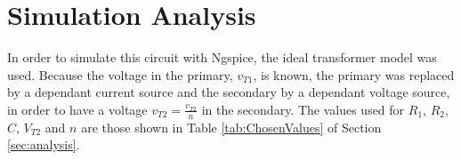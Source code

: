 \section{Simulation Analysis} \label{sec:simulation}

In order to simulate this circuit with Ngspice, the ideal transformer model was used. Because the voltage in the primary, $v_{T1}$, is known, the primary was replaced by a dependant current source and the secondary by a dependant voltage source, in order to have a voltage $v_{T2}=\frac{v_{T2}}{n}$ in the secondary. The values used for $R_1$, $R_2$, $C$, $V_{T2}$ and $n$ are those shown in Table \ref{tab:ChosenValues} of Section \ref{sec:analysis}.


